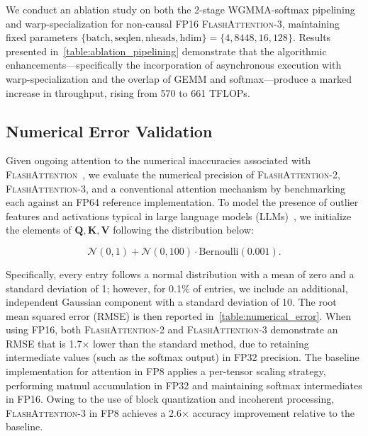 \begin{enumerate}
\begin{algorithm}[H]
\begin{algorithmic}[1]
We conduct an ablation study on both the 2-stage WGMMA-softmax pipelining and warp-specialization for non-causal FP16 \textsc{FlashAttention-3}, maintaining fixed parameters $\{\text{batch}, \text{seqlen}, \text{nheads}, \text{hdim}\} = \{ 4, 8448, 16, 128\}$. Results presented in~\cref{table:ablation_pipelining} demonstrate that the algorithmic enhancements—specifically the incorporation of asynchronous execution with warp-specialization and the overlap of GEMM and softmax—produce a marked increase in throughput, rising from 570 to 661 TFLOPs.

\subsection{Numerical Error Validation}
\label{sec:numerical_error}

Given ongoing attention to the numerical inaccuracies associated with \textsc{FlashAttention}~\citep{golden2024flash}, we evaluate the numerical precision of \textsc{FlashAttention-2}, \textsc{FlashAttention-3}, and a conventional attention mechanism by benchmarking each against an FP64 reference implementation. To model the presence of outlier features and activations typical in large language models (LLMs)~\citep{dettmers2208llm, sun2024massive}, we initialize the elements of $\mathbf{Q}, \mathbf{K}, \mathbf{V}$ following the distribution below:

\begin{equation*}
  \mathcal{N}(0, 1) + \mathcal{N}(0, 100) \cdot \mathrm{Bernoulli}(0.001).
\end{equation*}

Specifically, every entry follows a normal distribution with a mean of zero and a standard deviation of 1; however, for 0.1\% of entries, we include an additional, independent Gaussian component with a standard deviation of 10. The root mean squared error (RMSE) is then reported in~\cref{table:numerical_error}.
When using FP16, both \textsc{FlashAttention-2} and \textsc{FlashAttention-3} demonstrate an RMSE that is 1.7$\times$ lower than the standard method, due to retaining intermediate values (such as the softmax output) in FP32 precision. The baseline implementation for attention in FP8 applies a per-tensor scaling strategy, performing matmul accumulation in FP32 and maintaining softmax intermediates in FP16. Owing to the use of block quantization and incoherent processing, \textsc{FlashAttention-3} in FP8 achieves a 2.6$\times$ accuracy improvement relative to the baseline.


\end{algorithmic}
\end{algorithm}
\end{enumerate}
